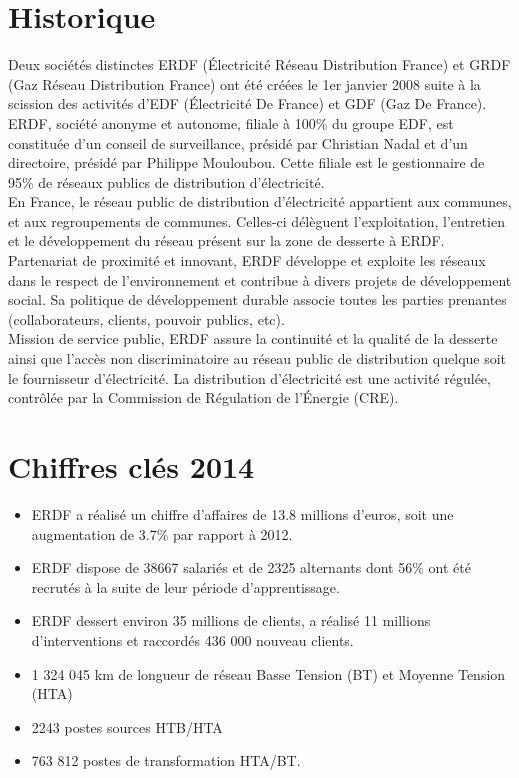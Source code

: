 \section{Historique}
Deux sociétés distinctes ERDF (Électricité Réseau Distribution France) et GRDF (Gaz Réseau Distribution
France) ont été créées le 1er janvier 2008 suite à la scission des activités d'EDF (Électricité De
France) et GDF (Gaz De France).
ERDF, société anonyme et autonome, filiale à 100\% du groupe EDF, est constituée d'un conseil de
surveillance, présidé par Christian Nadal et d'un directoire, présidé par Philippe Mouloubou.
Cette filiale est le gestionnaire de 95\% de réseaux publics de distribution d'électricité.\\
En France, le réseau public de distribution d'électricité appartient aux communes, et aux
regroupements de communes. Celles-ci délèguent l'exploitation, l'entretien et le développement du
réseau présent sur la zone de desserte à ERDF.\\
Partenariat de proximité et innovant, ERDF développe et exploite les réseaux dans le respect de l'environnement et contribue à divers projets de développement social. Sa politique de développement durable associe toutes les parties prenantes (collaborateurs, clients, pouvoir publics, etc).\\
Mission de service public, ERDF assure la continuité et la qualité de la desserte ainsi que l'accès non discriminatoire au réseau public de distribution quelque soit le fournisseur d'électricité. La distribution d'électricité est une activité régulée, contrôlée par la Commission de Régulation de l'Énergie (CRE).
\section{Chiffres clés 2014}
\begin{itemize}
\item ERDF a réalisé un chiffre d'affaires de 13.8 millions d'euros, soit une augmentation de 3.7\% par rapport à 2012.
\item ERDF dispose de 38667 salariés et de 2325 alternants dont 56\% ont été recrutés à la suite de leur période d'apprentissage.
\item ERDF dessert environ 35 millions de clients, a réalisé 11 millions d'interventions et raccordés 436 000 nouveau clients.
\item 1 324 045 km de longueur de réseau Basse Tension (BT) et Moyenne Tension (HTA)
\item 2243 postes sources HTB/HTA
\item 763 812 postes de transformation HTA/BT.
\end{itemize}
